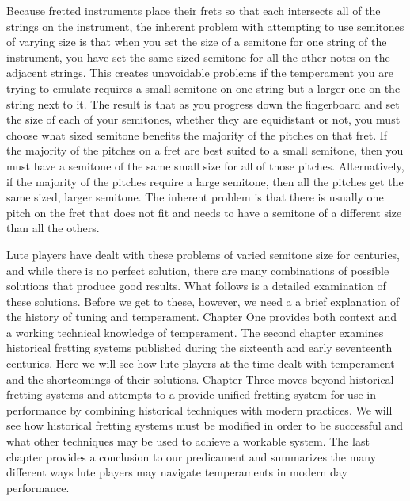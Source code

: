 Because fretted instruments place their frets so that each intersects all of the
strings on the instrument, the inherent problem with attempting to use semitones of
varying size is that when you set the size of a semitone for one string of the
instrument, you have set the same sized semitone for all the other notes on the
adjacent strings. This creates unavoidable problems if the temperament you are trying
to emulate requires a small semitone on one string but a larger one
on the string next to it. The result is that as you progress down the fingerboard and
set the size of each of your semitones, whether they are equidistant or not, you must
choose what sized semitone benefits the majority of the pitches on that fret. If the
majority of the pitches on a fret are best suited to a small semitone, then you must
have a semitone of the same small size for all of those pitches. Alternatively, if the
majority of the pitches require a large semitone, then all the pitches get the same
sized, larger semitone.  The inherent problem is that there is usually one pitch on the
fret that does not fit and needs to have a semitone of a different size than
all the others.

Lute players have dealt with these problems of varied semitone size for centuries, and
while there is no perfect solution, there are many combinations of
possible solutions that produce good results. What follows is a detailed examination
of these solutions.  Before we get to these, however, we need a a brief
explanation of the history of tuning and temperament. Chapter One provides both
context and a working technical knowledge of temperament. The second chapter
examines historical fretting systems published during the sixteenth and early
seventeenth centuries. Here we will see how lute players at the time dealt with
temperament and the shortcomings of their solutions. Chapter Three moves beyond
historical fretting systems and attempts to a provide unified fretting system for use
in performance by combining historical techniques with modern practices.  We will see
how historical fretting systems must be modified in order to be successful and what
other techniques may be used to achieve a workable system. The last chapter provides a
conclusion to our predicament and summarizes the many different ways lute players
may navigate temperaments in modern day performance.
